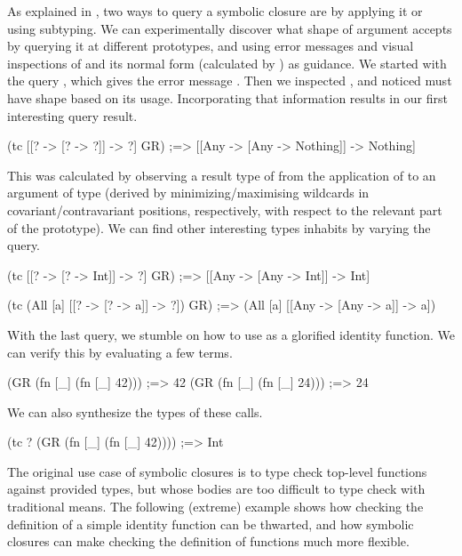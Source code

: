 \documentclass[11pt]{iuthesis}
\begin{document}
As explained in , two ways
to query a symbolic closure are by applying it or using subtyping.
We can experimentally discover what shape of argument \GRterm accepts 
by querying it at different prototypes, and using error messages and
visual inspections of \GRterm and its normal form (calculated by \GRclosure) as guidance.
We started with the query , which
gives the error message .
Then we inspected \GRclosure, and noticed 
must have shape \clj{[? -> [? -> ?]]} based on its usage.
Incorporating that information results in our first interesting query result.

\begin{cljlisting}
(tc [[? -> [? -> ?]] -> ?]
    GR)
;=> [[Any -> [Any -> Nothing]] -> Nothing]
\end{cljlisting}

This was calculated by observing a result type of 
from the application of \GRclosure to an argument of type 
(derived by minimizing/maximising wildcards 
in covariant/contravariant positions, respectively, with respect to the relevant part of the prototype).
We can find other interesting types \GRclosure inhabits by varying the query.

\begin{cljlisting}
(tc [[? -> [? -> Int]] -> ?]
    GR)
;=> [[Any -> [Any -> Int]] -> Int]

(tc (All [a] [[? -> [? -> a]] -> ?])
    GR)
;=> (All [a] [[Any -> [Any -> a]] -> a])
\end{cljlisting}

With the last query, we stumble on how to use \GRterm as a glorified identity function.
We can verify this by evaluating a few terms.

\begin{cljlisting}
(GR (fn [_] (fn [_] 42))) ;=> 42
(GR (fn [_] (fn [_] 24))) ;=> 24
\end{cljlisting}

We can also synthesize the types of these calls.

\begin{cljlisting}
(tc ? (GR (fn [_] (fn [_] 42))))
;=> Int
\end{cljlisting}

The original use case of symbolic closures is to type check
top-level functions against provided types,
but whose bodies are too difficult to type check with traditional means.
The following (extreme) example shows how checking the definition
of a simple identity function can be thwarted, and how symbolic closures
can make checking the definition of functions much more flexible.
\end{document}
